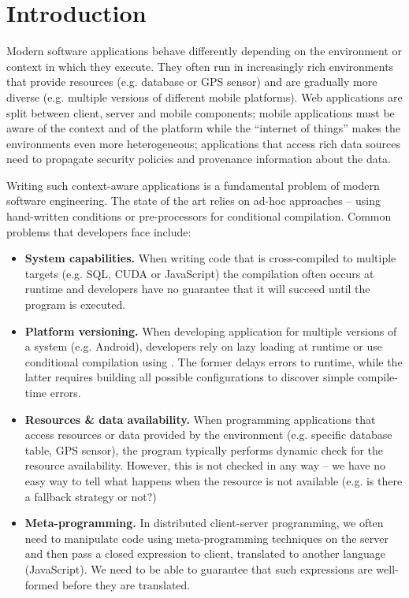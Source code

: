 \chapter{Introduction} 
\label{ch:introduction} 


Modern software applications behave differently depending on the environment or context 
in which they execute. They often run in increasingly rich environments that provide 
resources (e.g. database or GPS sensor) and are gradually more diverse (e.g. multiple 
versions of different mobile platforms). Web applications are split between client, server 
and mobile components; mobile applications must be aware of the context and of the platform 
while the ``internet of things'' makes the environments even more heterogeneous; 
applications that access rich data sources need to propagate security policies and provenance 
information about the data.

Writing such context-aware applications is a fundamental problem of modern software 
engineering. The state of the art relies on ad-hoc approaches -- using hand-written conditions 
or pre-processors for conditional compilation. Common problems that developers face include: 

\begin{itemize}
\item \textbf{System capabilities.} When writing code that is cross-compiled to multiple 
  targets (e.g. SQL, CUDA or JavaScript) the compilation often occurs at runtime and developers 
  have no guarantee that it will succeed until the program is executed.
  
\item \textbf{Platform versioning.} When developing application for multiple versions of a 
  system (e.g. Android), developers rely on lazy loading at runtime or use conditional compilation 
  using . The former delays errors to runtime, while the latter requires building all 
  possible configurations to discover simple compile-time errors.
  
\item \textbf{Resources \& data availability.} When programming applications that access 
  resources or data provided by the environment (e.g. specific database table, GPS sensor), 
  the program typically performs dynamic check for the resource availability. However, this 
  is not checked in any way -- we have no easy way to tell what happens when the resource is 
  not available (e.g. is there a fallback strategy or not?)

\item \textbf{Meta-programming.} In distributed client-server programming, we often need to 
  manipulate code using meta-programming techniques on the server and then pass a closed 
  expression to client, translated to another language (JavaScript). We need to be able to 
  guarantee that such expressions are well-formed before they are translated.
\end{itemize}

